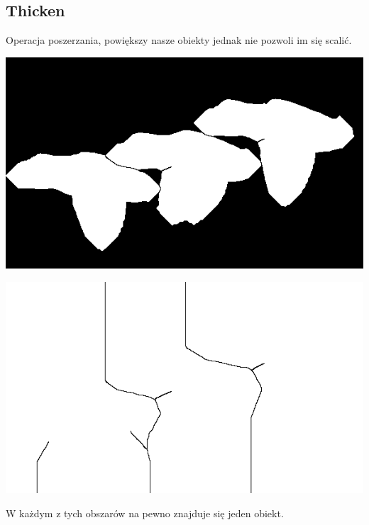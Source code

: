 \documentclass{article}
\begin{document}
	\subsection{Thicken}
	Operacja poszerzania, powiększy nasze obiekty jednak nie pozwoli im się scalić.
	\begin{center}
		\includegraphics[width=\linewidth]{../../lab05/kaczki_thicken_20.png}
	\end{center}
	\begin{center}
		\includegraphics[width=\linewidth]{../../lab05/kaczki_thicken_Inf.png}
	\end{center}
	W każdym z tych obszarów na pewno znajduje się jeden obiekt.
	
\end{document}

